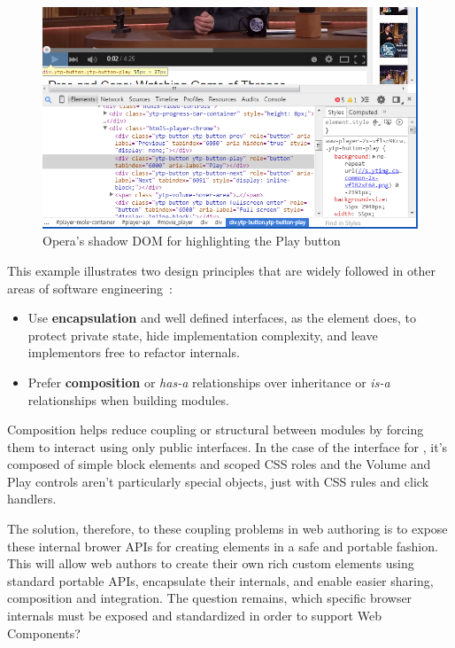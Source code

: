 % 
\begin{figure}[htb]
\centering
 \includegraphics[width=5.5in]{images/html5_video_control.png}
\caption{Opera's shadow DOM for  highlighting the Play button}
\label{f:html5video}
\end{figure}
%

This example illustrates two design principles that are widely followed in other areas of software engineering~\cite{fowler2012}:
\begin{itemize}
\item Use \textbf{encapsulation} and well defined interfaces, as the  element does, to protect private state, hide implementation complexity, and leave implementors free to refactor internals.
\item Prefer \textbf{composition} or \textit{has-a} relationships over inheritance or \textit{is-a} relationships when building modules. 
\end{itemize}

Composition helps reduce coupling or structural between modules by forcing them to interact using only public interfaces.
In the case of the interface for , it's composed of simple block elements and scoped CSS roles and the Volume and Play controls aren't particularly special objects, just  with CSS rules and click handlers.

The solution, therefore, to these coupling problems in web authoring is to expose these internal brower APIs for creating elements in a safe and portable fashion. 
This will allow web authors to create their own rich custom elements using standard portable APIs, encapsulate their internals, and enable easier sharing, composition and integration.
The question remains, which specific browser internals must be exposed and standardized in order to support Web Components?

